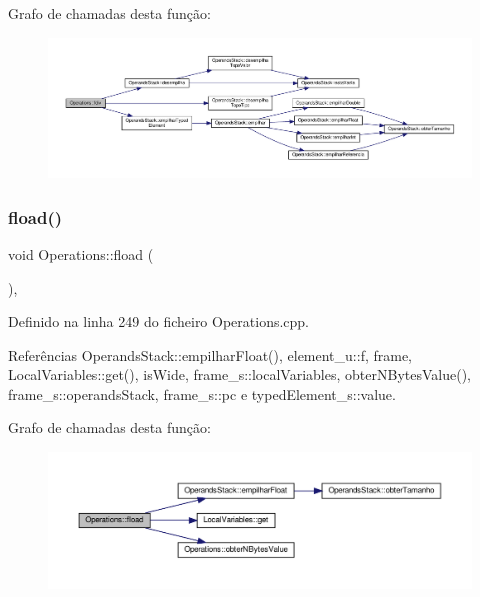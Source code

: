 Grafo de chamadas desta função\+:\nopagebreak
\begin{figure}[H]
\begin{center}
\leavevmode
\includegraphics[width=350pt]{classOperations_a85d79532189d640a6d02c99f204d2229_cgraph}
\end{center}
\end{figure}
\mbox{\label{classOperations_af6204248b38b7e6af3a4a6d0f805d79f}} 
\subsubsection{\texorpdfstring{fload()}{fload()}}
{\footnotesize\ttfamily void Operations\+::fload (\begin{DoxyParamCaption}{ }\end{DoxyParamCaption})\hspace{0.3cm}{\ttfamily [static]}, {\ttfamily [private]}}



Definido na linha 249 do ficheiro Operations.\+cpp.



Referências Operands\+Stack\+::empilhar\+Float(), element\+\_\+u\+::f, frame, Local\+Variables\+::get(), is\+Wide, frame\+\_\+s\+::local\+Variables, obter\+N\+Bytes\+Value(), frame\+\_\+s\+::operands\+Stack, frame\+\_\+s\+::pc e typed\+Element\+\_\+s\+::value.

Grafo de chamadas desta função\+:\nopagebreak
\begin{figure}[H]
\begin{center}
\leavevmode
\includegraphics[width=350pt]{classOperations_af6204248b38b7e6af3a4a6d0f805d79f_cgraph}
\end{center}
\end{figure}
\mbox{\label{classOperations_a844c8a8d812c4f78c8f1024bbdac0548}} 
